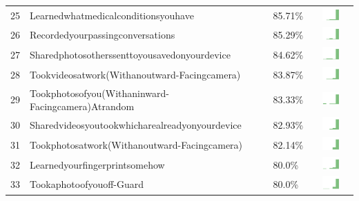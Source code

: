 \documentclass[a4paper,12pt]{article}
\begin{document}
\begin{longtable}{| p{0.5cm} | p{7cm} | p{1cm} | c |}
25 & Learnedwhatmedicalconditionsyouhave & 85.71\% & \includegraphics[width = 2cm, height = 0.5cm]{learnedwhatmedicalconditionsyouhavePUBLIC} \\  
26 & Recordedyourpassingconversations & 85.29\% & \includegraphics[width = 2cm, height = 0.5cm]{recordedyourpassingconversationsPUBLIC} \\  
27 & Sharedphotosotherssenttoyousavedonyourdevice & 84.62\% & \includegraphics[width = 2cm, height = 0.5cm]{sharedphotosotherssenttoyousavedonyourdevicePUBLIC} \\  
28 & Tookvideosatwork(Withanoutward-Facingcamera) & 83.87\% & \includegraphics[width = 2cm, height = 0.5cm]{tookvideosatwork(withanoutward-facingcamera)PUBLIC} \\  
29 & Tookphotosofyou(Withaninward-Facingcamera)Atrandom & 83.33\% & \includegraphics[width = 2cm, height = 0.5cm]{tookphotosofyou(withaninward-facingcamera)atrandomPUBLIC} \\  
30 & Sharedvideosyoutookwhicharealreadyonyourdevice & 82.93\% & \includegraphics[width = 2cm, height = 0.5cm]{sharedvideosyoutookwhicharealreadyonyourdevicePUBLIC} \\  
31 & Tookphotosatwork(Withanoutward-Facingcamera) & 82.14\% & \includegraphics[width = 2cm, height = 0.5cm]{tookphotosatwork(withanoutward-facingcamera)PUBLIC} \\  
32 & Learnedyourfingerprintsomehow & 80.0\% & \includegraphics[width = 2cm, height = 0.5cm]{learnedyourfingerprintsomehowPUBLIC} \\  
33 & Tookaphotoofyouoff-Guard & 80.0\% & \includegraphics[width = 2cm, height = 0.5cm]{tookaphotoofyouoff-guardPUBLIC} \\  

\end{longtable}
\end{document}
